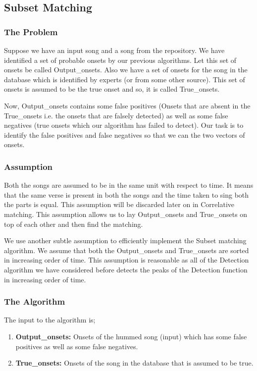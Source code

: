 \documentclass[10pt]{article}
\begin{document}
\subsection{Subset Matching}
\subsubsection{The Problem}
Suppose we have an input song and a song from the repository. We have identified a set of probable onsets by our previous algorithms. Let this set of onsets be called Output\_onsets. Also we have a set of onsets for the song in the database which is identified by experts (or from some other source). This set of onsets is assumed to be the true onset and so, it is called True\_onsets. 

Now, Output\_onsets contains some false positives (Onsets that are absent in the True\_onsets i.e. the onsets that are falsely detected) as well as some false negatives (true onsets which our algorithm has failed to detect). Our task is to identify the false positives and false negatives so that we can the two vectors of onsets.

\subsubsection{Assumption}

Both the songs are assumed to be in the same unit with respect to time. It means that the same verse is present in both the songs and the time taken to sing both the parts is equal. This assumption will be discarded later on in Correlative matching. This assumption allows us to lay Output\_onsets and True\_onsets on top of each other and then find the matching.

We use another subtle assumption to efficiently implement the Subset matching algorithm. We assume that both the Output\_onsets and True\_onsets are sorted in increasing order of time. This assumption is reasonable as all of the Detection algorithm we have considered before detects the peaks of the Detection function in increasing order of time.

\subsubsection{The Algorithm}

The input to the algorithm is;
\begin{enumerate}
    \item \textbf{Output\_onsets:} Onsets of the hummed song (input) which has some false positives as well as some false negatives.
    \item \textbf{True\_onsets:} Onsets of the song in the database that is assumed to be true.
\end{enumerate}
\end{document}
